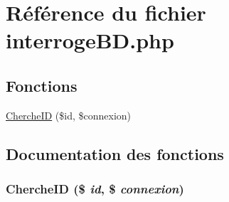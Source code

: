 \hypertarget{interrogeBD_8php}{
\section{R\'{e}f\'{e}rence du fichier interroge\-BD.php}
\label{interrogeBD_8php}
}
\subsection*{Fonctions}
\begin{CompactItemize}
\item 
\hyperlink{interrogeBD_8php_a0}{Cherche\-ID} (\$id, \$connexion)
\end{CompactItemize}


\subsection{Documentation des fonctions}
\hypertarget{interrogeBD_8php_a0}{
\subsubsection[ChercheID]{\setlength{\rightskip}{0pt plus 5cm}Cherche\-ID (\$ {\em id}, \$ {\em connexion})}}
\label{interrogeBD_8php_a0}



